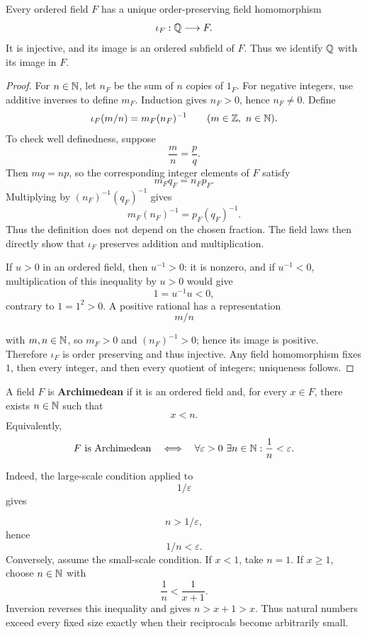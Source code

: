 \begin{theorem}
\label{thm:canonical-rationals}
Every ordered field \(F\) has a unique order-preserving field homomorphism
\[
\iota_F:\mathbb{Q}\longrightarrow F.
\]
It is injective, and its image is an ordered subfield of \(F\).  Thus we
identify \(\mathbb{Q}\) with its image in \(F\).
\end{theorem}
\begin{proof}
For \(n\in\mathbb{N}\), let \(n_F\) be the sum of \(n\) copies of \(1_F\).
For negative integers, use additive inverses to define \(m_F\). Induction
gives \(n_F>0\), hence \(n_F\ne0\). Define
\[
\iota_F(m/n)=m_F(n_F)^{-1}
\qquad(m\in\mathbb{Z},\ n\in\mathbb{N}).
\]
To check well definedness, suppose
\[
\frac mn=\frac pq.
\]
Then \(mq=np\), so the corresponding integer elements of \(F\) satisfy
\[
m_Fq_F=n_Fp_F.
\]
Multiplying by \((n_F)^{-1}(q_F)^{-1}\) gives
\[
m_F(n_F)^{-1}=p_F(q_F)^{-1}.
\]
Thus the definition does not depend on the chosen fraction. The field laws
then directly show that \(\iota_F\) preserves addition and multiplication.

If \(u>0\) in an ordered field, then \(u^{-1}>0\): it is nonzero, and if
\(u^{-1}<0\), multiplication of this inequality by \(u>0\) would give
\[
1=u^{-1}u<0,
\]
contrary to \(1=1^2>0\). A positive rational has a representation
\[
m/n
\]

with \(m,n\in\mathbb{N}\), so \(m_F>0\) and \((n_F)^{-1}>0\); hence its image is
positive. Therefore \(\iota_F\) is order preserving and thus injective.
Any field homomorphism fixes \(1\), then every integer, and then every
quotient of integers; uniqueness follows.
\end{proof}

\begin{definition}\label{def:archimedean-field}
A field \(F\) is \textbf{Archimedean} if it is an ordered field and, for
every \(x\in F\), there exists \(n\in\mathbb{N}\) such that
\[
x<n.
\]
Equivalently,
\[
F\text{ is Archimedean}
\quad\Longleftrightarrow\quad
\forall\varepsilon>0\ \exists n\in\mathbb{N}:
\frac1n<\varepsilon.
\]
\end{definition}
Indeed, the large-scale condition applied to
\[
1/\varepsilon
\]
 gives

\[
n>1/\varepsilon,
\]
 hence
\[
1/n<\varepsilon.
\]
 Conversely, assume the
small-scale condition. If \(x<1\), take \(n=1\). If \(x\geq1\), choose
\(n\in\mathbb{N}\) with
\[
\frac1n<\frac1{x+1}.
\]
Inversion reverses this inequality and gives \(n>x+1>x\). Thus natural
numbers exceed every fixed size exactly when their reciprocals become
arbitrarily small.


